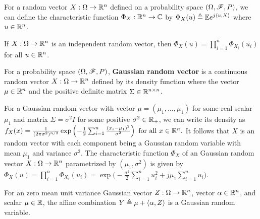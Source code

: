 \documentclass[letterpaper,10pt,english]{article}
\begin{document}
\begin{defn}
For a random vector $X: \Omega\to \mathbb{R}^n$ defined on a probability space $(\Omega,\mathscr{F},P)$, 
we can define the characteristic function $\Phi_X:\mathbb{R}^n\to\mathbb{C}$ by $\Phi_X(u) \triangleq \mathbb{E} e^{j \left\langle u,X\right\rangle}$ where $u \in \mathbb{R}^n$. 
\end{defn}
\begin{rem}
If $X:\Omega\to\mathbb{R}^n$ is an independent random vector, 
then $\Phi_X(u) = \prod_{i=1}^n\Phi_{X_i}(u_i)$ for all $u \in \mathbb{R}^n$.
\end{rem}
\begin{defn}%
For a probability space $(\Omega, \mathscr{F}, P)$, 
\textbf{Gaussian random vector} is a continuous random vector $X: \Omega \to \mathbb{R}^n$ defined by its density function
where the vector $\mu \in \mathbb{R}^n$ and the positive definite matrix $\Sigma \in \mathbb{R}^{n \times n}$. 
\end{defn}
\begin{rem} 
For a Gaussian random vector with vector $\mu = (\mu_1, \dots, \mu_1)$ for some real scalar $\mu_1$ and matrix $\Sigma = \sigma^2I$ for some positive $\sigma^2 \in \mathbb{R}_+$, 
we can write its density as 
$
f_X(x) = \frac{1}{(2\pi\sigma^2)^{n/2}}\exp\left(-\frac{1}{2}\sum_{i=1}^n\frac{(x_i-\mu_1)^2}{\sigma^2}\right)\text{ for all }x \in \mathbb{R}^n.
$
It follows that $X$ is an \iid random vector with each component being a Gaussian random variable with mean $\mu_1$ and variance $\sigma^2$. 
The characteristic function $\Phi_X$ of an \iid Gaussian random vector $X:\Omega\to \mathbb{R}^n$ parametrized by $(\mu_1,\sigma^2)$ is given by 
$
\Phi_X(u) = \prod_{i=1}^n\Phi_{X_i}(u_i) = \exp\Big(-\frac{\sigma^2}{2}\sum_{i=1}^nu_i^2 +j\mu_1\sum_{i=1}^nu_i\Big).
$
\end{rem}
\begin{lem} 
For an \iid zero mean unit variance Gaussian vector $Z:\Omega\to\mathbb{R}^n$, vector $\alpha \in \mathbb{R}^n$, and scalar $\mu \in \mathbb{R}$, 
the affine combination $Y \triangleq \mu + \left\langle \alpha, Z\right\rangle$ is a Gaussian random variable.  
\end{lem}
\end{document}
